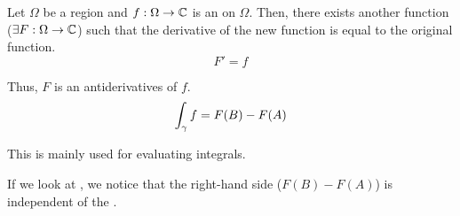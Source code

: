 \begin{theorem}\label{thm:Complex_Antiderivative}
  Let $\Omega$ be a   region and $f: \Omega \to \operatorname{\mathbb{C}}$ is an   on $\Omega$.
  Then, there exists another  function ($\exists F: \Omega \to \operatorname{\mathbb{C}}$) such that the derivative of the new function is equal to the original function.
  \begin{equation*}
    F' = f
  \end{equation*}

  Thus, $F$ is an antiderivatives of $f$.
  \begin{equation}\label{eq:Complex_Antiderivative}
    \int_{\gamma} f = F(B) - F(A)
  \end{equation}

  \begin{remark*}[Use]
    This is mainly used for evaluating integrals.
  \end{remark*}
\end{theorem}

If we look at , we notice that the right-hand side ($F(B) - F(A)$) is independent of the .

